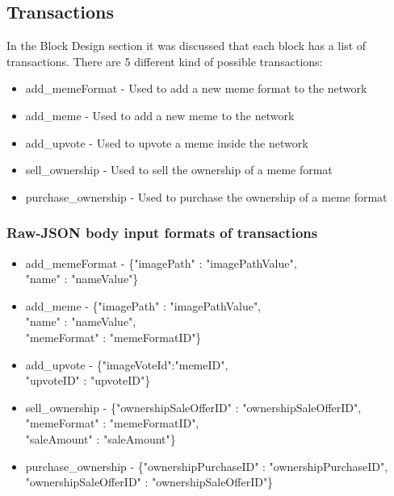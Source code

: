 \documentclass[12pt]{article}
\begin{document}
\subsection{Transactions} %

In the Block Design section it was discussed that each block has a list of transactions. There are 5 different kind of possible transactions:
\begin{itemize}
  \item add\_memeFormat - Used to add a new meme format to the network
  \item add\_meme - Used to add a new meme to the network
  \item add\_upvote - Used to upvote a meme inside the network
  \item sell\_ownership - Used to sell the ownership of a meme format
  \item purchase\_ownership - Used to purchase the ownership of a meme format
\end{itemize}

\subsubsection{Raw-JSON body input formats of transactions}

\begin{itemize}
\item add\_memeFormat - \{"imagePath" : "imagePathValue",\\ "name" : "nameValue"\}

\item add\_meme - \{"imagePath" : "imagePathValue",\\ "name" : "nameValue",\\ "memeFormat" : "memeFormatID"\}

\item add\_upvote - \{"imageVoteId":"memeID",\\ "upvoteID" : "upvoteID"\}

\item sell\_ownership - \{"ownershipSaleOfferID" : "ownershipSaleOfferID",\\ "memeFormat" : "memeFormatID",\\ "saleAmount" : "saleAmount"\}

\item purchase\_ownership - \{"ownershipPurchaseID" : "ownershipPurchaseID",\\ "ownershipSaleOfferID" : "ownershipSaleOfferID"\}
\end{itemize}
\end{document}
